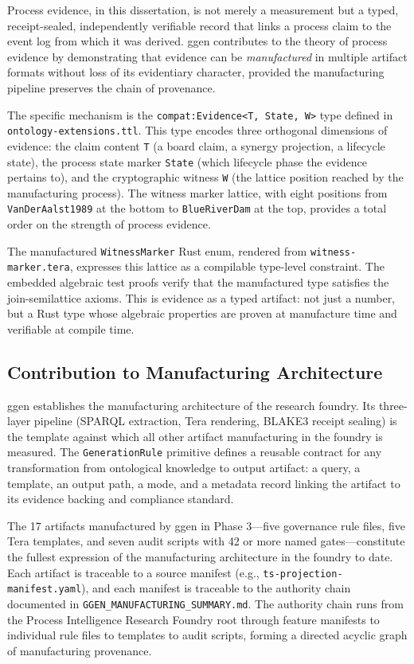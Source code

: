 Process evidence, in this dissertation, is not merely a measurement but a typed, receipt-sealed,
independently verifiable record that links a process claim to the event log from which it was
derived. ggen contributes to the theory of process evidence by demonstrating that evidence can be
\emph{manufactured} in multiple artifact formats without loss of its evidentiary character,
provided the manufacturing pipeline preserves the chain of provenance.

The specific mechanism is the \texttt{compat:Evidence<T, State, W>} type defined in
\texttt{ontology-extensions.ttl}. This type encodes three orthogonal dimensions of evidence: the
claim content \texttt{T} (a board claim, a synergy projection, a lifecycle state), the process
state marker \texttt{State} (which lifecycle phase the evidence pertains to), and the cryptographic
witness \texttt{W} (the lattice position reached by the manufacturing process). The witness marker
lattice, with eight positions from \texttt{VanDerAalst1989} at the bottom to
\texttt{BlueRiverDam} at the top, provides a total order on the strength of process evidence.

The manufactured \texttt{WitnessMarker} Rust enum, rendered from \texttt{witness-marker.tera},
expresses this lattice as a compilable type-level constraint. The embedded algebraic test proofs
verify that the manufactured type satisfies the join-semilattice axioms. This is evidence as a
typed artifact: not just a number, but a Rust type whose algebraic properties are proven at
manufacture time and verifiable at compile time.

\subsection{Contribution to Manufacturing Architecture}
\label{sec:ggen-contribution-manufacturing}

ggen establishes the manufacturing architecture of the research foundry. Its three-layer pipeline
(SPARQL extraction, Tera rendering, BLAKE3 receipt sealing) is the template against which all
other artifact manufacturing in the foundry is measured. The \texttt{GenerationRule} primitive
defines a reusable contract for any transformation from ontological knowledge to output artifact:
a query, a template, an output path, a mode, and a metadata record linking the artifact to its
evidence backing and compliance standard.

The 17 artifacts manufactured by ggen in Phase 3---five governance rule files, five Tera
templates, and seven audit scripts with 42 or more named gates---constitute the fullest expression
of the manufacturing architecture in the foundry to date. Each artifact is traceable to a source
manifest (e.g., \texttt{ts-projection-manifest.yaml}), and each manifest is traceable to the
authority chain documented in \texttt{GGEN\_MANUFACTURING\_SUMMARY.md}. The authority chain runs
from the Process Intelligence Research Foundry root through feature manifests to individual rule
files to templates to audit scripts, forming a directed acyclic graph of manufacturing provenance.

